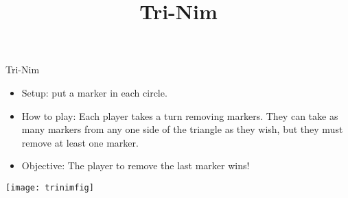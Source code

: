 \documentclass[12pt]{report}
\title{Tri-Nim}
\begin{document}
\thispagestyle{empty}

\begin{center}
  \Huge{Tri-Nim}
\end{center}

\begin{itemize}
\item Setup: put a marker in each circle.
\item How to play: Each player takes a turn removing markers.  They
  can take as many markers from any one side of the triangle as they
  wish, but they must remove at least one marker.
\item Objective: The player to remove the last marker wins!
\end{itemize}
  
\begin{center}
  \texttt{[image: trinimfig]}
\end{center}
\end{document}
